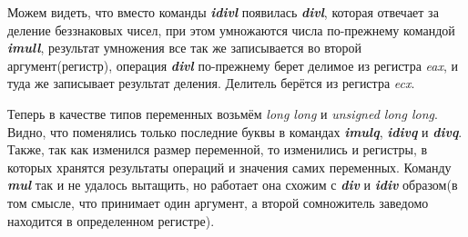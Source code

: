 \documentclass[a4paper,12pt]{article}
\begin{document}
Можем видеть, что вместо команды \textit{\textbf{idivl}} появилась \textit{\textbf{divl}}, которая отвечает за деление беззнаковых чисел, при этом умножаются числа по-прежнему командой \textit{\textbf{imull}}, результат умножения все так же записывается во второй аргумент(регистр), операция \textit{\textbf{divl}} по-прежнему берет делимое из регистра \textit{eax}, и туда же записывает результат деления. Делитель берётся из регистра \textit{ecx}.

Теперь в качестве типов переменных возьмём \textit{long long} и \textit{unsigned long long}. Видно, что поменялись только последние буквы в командах \textit{\textbf{imulq}}, \textit{\textbf{idivq}} и \textit{\textbf{divq}}. Также, так как изменился размер переменной, то изменились и регистры, в которых хранятся результаты операций и значения самих переменных. Команду \textit{\textbf{mul}} так и не удалось вытащить, но работает она схожим с \textit{\textbf{div}} и \textit{\textbf{idiv}}\textbf{} образом(в том смысле, что принимает один аргумент, а второй сомножитель заведомо находится в определенном регистре).

\begin{figure}[H]
    \label{fig:resul'tat slojenia C++ and C}
\end{figure}
\end{document}
